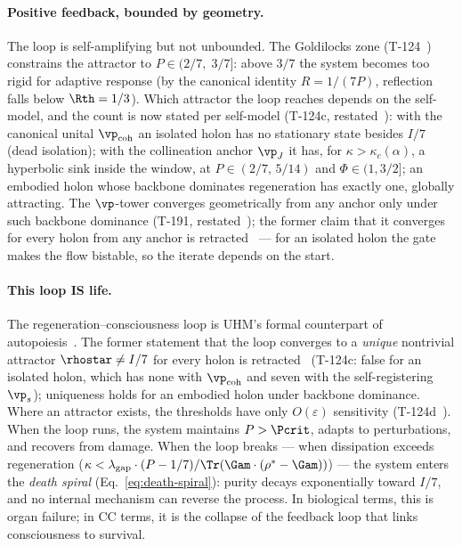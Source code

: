 \paragraph{Positive feedback, bounded by geometry.}
The loop is self-amplifying but not unbounded.  The Goldilocks zone
(T-124~) constrains the attractor to $P \in (2/7,\; 3/7]$: above $3/7$ the
system becomes too rigid for adaptive response (by the canonical identity $R = 1/(7P)$,
reflection falls below $\Rth = 1/3$).  Which attractor the loop reaches depends
on the self-model, and the count is now stated per self-model (T-124c,
restated~): with the canonical unital $\vp_{\mathrm{coh}}$ an isolated
holon has no stationary state besides $I/7$ (dead isolation); with the
collineation anchor $\vp_J$ it has, for $\kappa > \kappa_c(\alpha)$, a hyperbolic
sink inside the window, at $P \in (2/7,\, 5/14)$ and $\Phi \in (1, 3/2]$; an
embodied holon whose backbone dominates regeneration has exactly one, globally
attracting. The $\vp$-tower converges geometrically from any anchor only under
such backbone dominance (T-191, restated~); the former claim that it
converges for every holon from any anchor is retracted~\status{$\times$} ---
for an isolated holon the gate makes the flow bistable, so the iterate depends
on the start.

\paragraph{This loop IS life.}
The regeneration--consciousness loop is UHM's formal counterpart of autopoiesis~\cite{varela1974}.
The former statement that the loop converges to a \emph{unique} nontrivial
attractor $\rhostar \neq I/7$ for every holon is retracted~\status{$\times$}
(T-124c: false for an isolated holon, which has none with $\vp_{\mathrm{coh}}$
and seven with the self-registering $\vp_s$); uniqueness holds for an embodied
holon under backbone dominance. Where an attractor exists, the thresholds have
only $O(\varepsilon)$ sensitivity (T-124d~).
When the loop runs, the system maintains $P > \Pcrit$, adapts to perturbations, and
recovers from damage.  When the loop breaks --- when dissipation exceeds regeneration
($\kappa < \lambda_{\mathrm{gap}} \cdot (P - 1/7) / \Tr(\Gam \cdot (\rho^* - \Gam))$)
--- the system enters the \emph{death spiral} (Eq.~\ref{eq:death-spiral}): purity decays
exponentially toward $I/7$, and no internal mechanism can reverse the process.  In
biological terms, this is organ failure; in CC terms, it is the collapse of the feedback
loop that links consciousness to survival.

